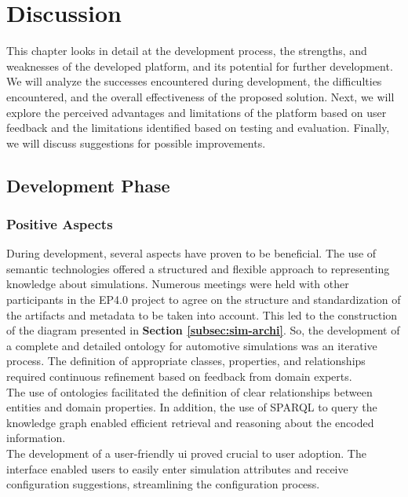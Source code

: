 \section{Discussion \label{sec:discussion}}
This chapter looks in detail at the development process, the strengths, and weaknesses of the developed platform, and its potential for further development. We will analyze the successes encountered during development, the difficulties encountered, and the overall effectiveness of the proposed solution.  Next, we will explore the perceived advantages and limitations of the platform based on user feedback and the limitations identified based on testing and evaluation. Finally, we will discuss suggestions for possible improvements.\\



\subsection{Development Phase}
    \subsubsection*{Positive Aspects}
    During development, several aspects have proven to be beneficial. The use of semantic technologies offered a structured and flexible approach to representing knowledge about simulations. Numerous meetings were held with other participants in the EP4.0 project to agree on the structure and standardization of the artifacts and metadata to be taken into account. This led to the construction of the diagram presented in \textbf{Section \ref{subsec:sim-archi}}. So, the development of a complete and detailed ontology for automotive simulations was an iterative process. The definition of appropriate classes, properties, and relationships required continuous refinement based on feedback from domain experts.\\
    
    The use of ontologies facilitated the definition of clear relationships between entities and domain properties. In addition, the use of SPARQL to query the knowledge graph enabled efficient retrieval and reasoning about the encoded information.\\

    The development of a user-friendly \acrshort{ui} proved crucial to user adoption. The interface enabled users to easily enter simulation attributes and receive configuration suggestions, streamlining the configuration process.\\

